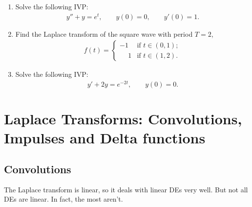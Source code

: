 \documentclass{book}
\begin{document}
\begin{enumerate}
\item
  Solve the following IVP:
  \begin{align*}
  y'' + y = e^t, \qquad y(0)=0, \qquad y'(0)=1.
  \end{align*}

\item
  Find the Laplace transform of the square wave with period $T=2$,
  \begin{align*}
  f(t) = \left\{ \begin{array}{ll}
    -1 & \mbox{if $t \in(0,1)$};\\
    \phantom{-}1 & \mbox{if $t \in (1,2)$}.\end{array} \right.
  \end{align*}

\item
  Solve the following IVP:
  \begin{align*}
  y' + 2y = e^{-2t}, \qquad y(0)=0.
  \end{align*}


\end{enumerate}


\chapter{Laplace Transforms: Convolutions, Impulses and Delta functions}

\section{Convolutions}
The Laplace transform is linear, so it deals with linear DEs very well. But not
all DEs are linear. In fact, the most aren't.
\end{document}
